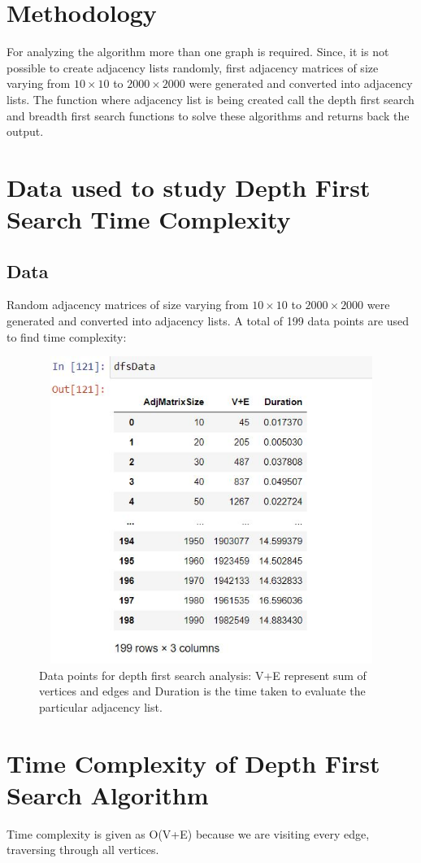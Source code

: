 \documentclass[12pt,runningheads]{article}
\begin{document}
\section{Methodology}
For analyzing the algorithm more than one graph is required. Since, it is not possible to create adjacency lists randomly, first adjacency matrices of size varying from $10\times 10$ to $2000\times 2000$ were generated and converted into adjacency lists. The function where adjacency list is being created call the depth first search and breadth first search functions to solve these algorithms and returns back the output.
\section{Data used to study Depth First Search Time Complexity}
\subsection{Data}
Random adjacency matrices of size varying from $10\times 10$ to $2000\times 2000$ were generated and converted into adjacency lists. A total of 199 data points are used to find time complexity:

\begin{figure}[htp]
    \centering
    \includegraphics[width=12cm,height=10cm]{dfsdata.JPG}
    \caption{Data points for depth first search analysis: V+E represent sum of vertices and edges and Duration is the time taken to evaluate the particular adjacency list.}
    \label{fig:galaxy}
\end{figure}

\section{Time Complexity of Depth First Search Algorithm}
Time complexity is given as O(V+E) because we are visiting every edge, traversing through all vertices. 
\end{document}
